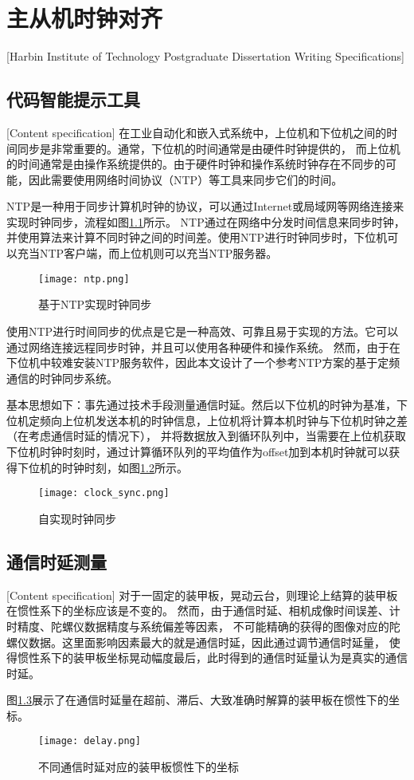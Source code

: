 \chapter[主从机时钟对齐]{主从机时钟对齐}[Harbin Institute of Technology Postgraduate Dissertation Writing Specifications]

\section{代码智能提示工具}[Content specification]
在工业自动化和嵌入式系统中，上位机和下位机之间的时间同步是非常重要的。通常，下位机的时间通常是由硬件时钟提供的，
而上位机的时间通常是由操作系统提供的。由于硬件时钟和操作系统时钟存在不同步的可能，因此需要使用网络时间协议（NTP）等工具来同步它们的时间。\par

NTP是一种用于同步计算机时钟的协议，可以通过Internet或局域网等网络连接来实现时钟同步，流程如图\ref{ntp}所示。
NTP通过在网络中分发时间信息来同步时钟，并使用算法来计算不同时钟之间的时间差。使用NTP进行时钟同步时，下位机可以充当NTP客户端，而上位机则可以充当NTP服务器。 \par
\begin{figure}[H]
    \centering
    \texttt{[image: ntp.png]} 
    \caption{基于NTP实现时钟同步} 
    \label{ntp}
\end{figure}


使用NTP进行时间同步的优点是它是一种高效、可靠且易于实现的方法。它可以通过网络连接远程同步时钟，并且可以使用各种硬件和操作系统。
然而，由于在下位机中较难安装NTP服务软件，因此本文设计了一个参考NTP方案的基于定频通信的时钟同步系统。\par

基本思想如下：事先通过技术手段测量通信时延。然后以下位机的时钟为基准，下位机定频向上位机发送本机的时钟信息，上位机将计算本机时钟与下位机时钟之差（在考虑通信时延的情况下），
并将数据放入到循环队列中，当需要在上位机获取下位机时钟时刻时，通过计算循环队列的平均值作为offset加到本机时钟就可以获得下位机的时钟时刻，如图\ref{clock_sync}所示。

\begin{figure}[H]
    \centering
    \texttt{[image: clock\_sync.png]} 
    \caption{自实现时钟同步} 
    \label{clock_sync}
\end{figure}


\section{通信时延测量}[Content specification]
对于一固定的装甲板，晃动云台，则理论上结算的装甲板在惯性系下的坐标应该是不变的。
然而，由于通信时延、相机成像时间误差、计时精度、陀螺仪数据精度与系统偏差等因素，
不可能精确的获得的图像对应的陀螺仪数据。这里面影响因素最大的就是通信时延，因此通过调节通信时延量，
使得惯性系下的装甲板坐标晃动幅度最后，此时得到的通信时延量认为是真实的通信时延。
\par
图\ref{delay}展示了在通信时延量在超前、滞后、大致准确时解算的装甲板在惯性下的坐标。

\begin{figure}[H]
    \centering
    \texttt{[image: delay.png]} 
    \caption{不同通信时延对应的装甲板惯性下的坐标} 
    \label{delay}
\end{figure}





